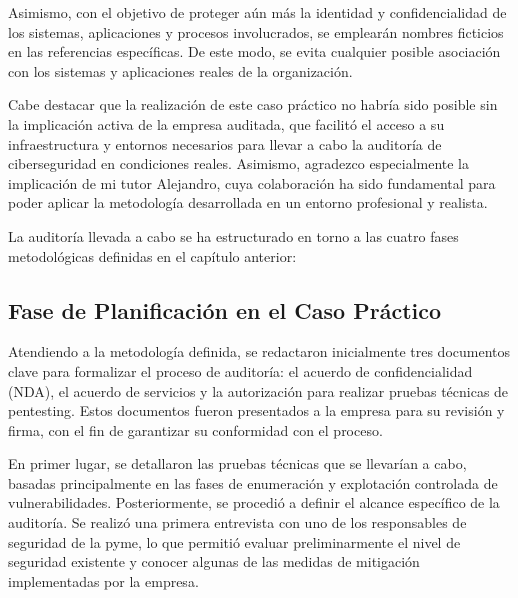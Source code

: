 \documentclass[a4paper, 11pt]{article}
\begin{document}
\par\vspace{0.5cm}

Asimismo, con el objetivo de proteger aún más la identidad y confidencialidad de los sistemas, aplicaciones y procesos involucrados, se emplearán nombres ficticios en las referencias específicas. De este modo, se evita cualquier posible asociación con los sistemas y aplicaciones reales de la organización.
\par\vspace{0.5cm}

Cabe destacar que la realización de este caso práctico no habría sido posible sin la implicación activa de la empresa auditada, que facilitó el acceso a su infraestructura y entornos necesarios para llevar a cabo la auditoría de ciberseguridad en condiciones reales. Asimismo, agradezco especialmente la implicación de mi tutor Alejandro, cuya colaboración ha sido fundamental para poder aplicar la metodología desarrollada en un entorno profesional y realista.

\par\vspace{0.5cm}

La auditoría llevada a cabo se ha estructurado en torno a las cuatro fases metodológicas definidas en el capítulo anterior:

\par\vspace{0.5cm}

\subsection{Fase de Planificación en el Caso Práctico}
\par\vspace{0.5cm}

Atendiendo a la metodología definida, se redactaron inicialmente tres documentos clave para formalizar el proceso de auditoría: el acuerdo de confidencialidad (NDA), el acuerdo de servicios y la autorización para realizar pruebas técnicas de pentesting. Estos documentos fueron presentados a la empresa para su revisión y firma, con el fin de garantizar su conformidad con el proceso.
\par\vspace{0.5cm}

En primer lugar, se detallaron las pruebas técnicas que se llevarían a cabo, basadas principalmente en las fases de enumeración y explotación controlada de vulnerabilidades. Posteriormente, se procedió a definir el alcance específico de la auditoría. Se realizó una primera entrevista con uno de los responsables de seguridad de la pyme, lo que permitió evaluar preliminarmente el nivel de seguridad existente y conocer algunas de las medidas de mitigación implementadas por la empresa.
\par\vspace{0.5cm}
\end{document}
